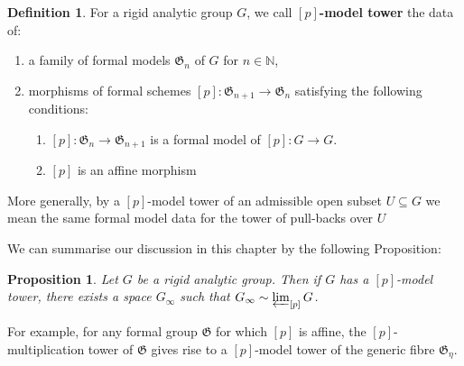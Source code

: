 \documentclass[10pt,oneside]{amsart}
\newtheorem{proposition}[theorem]{Proposition}
\theoremstyle{definition}
\newtheorem{definition}[theorem]{Definition}
\theoremstyle{remark}
\begin{document}
	\begin{definition}
		For a rigid analytic group $G$, we call \textbf{$[p]$-model tower} the data of:
		\begin{enumerate}
			\item a family of formal models $\mathfrak G_n$ of $G$ for $n\in \mathbb N$,
			\item morphisms of formal schemes $[p]:\mathfrak G_{n+1}\rightarrow \mathfrak G_{n}$ satisfying the following conditions:
			\begin{enumerate}
				\item $[p]:\mathfrak G_n\rightarrow \mathfrak G_{n+1}$ is a formal model of $[p]:G\rightarrow G$. 
				\item $[p]$ is an affine morphism
			\end{enumerate}
		\end{enumerate}
	\end{definition}
	More generally, by a $[p]$-model tower of an admissible open subset $U\subseteq G$ we mean the same formal model data for the tower of pull-backs over $U$
	
	\begin{center}
	\end{center}
	
	We can summarise our discussion in this chapter by the following Proposition:
	\begin{proposition}
		Let $G$ be a rigid analytic group. Then if $G$ has a $[p]$-model tower, there exists a space $G_\infty$ such that $G_\infty \sim \varprojlim_{[p]}G$.
	\end{proposition}
	For example, for any formal group $\mathfrak G$ for which $[p]$ is affine, the $[p]$-multiplication tower of $\mathfrak G$ gives rise to a $[p]$-model tower of the generic fibre $\mathfrak G_\eta$. 
\end{document}
